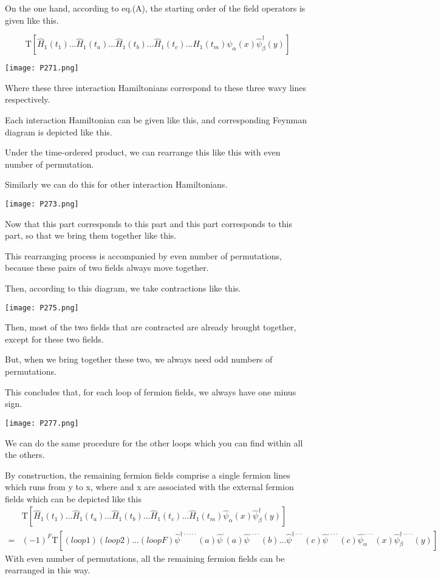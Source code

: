 On the one hand, according to eq.(A), the starting order of the field operators is given like this.

$$\mathrm{T}[\hat H_1(t_1)...\hat H_1(t_a)...\hat H_1(t_b)...\hat H_1(t_c)...\hat H_1(t_m)\hat \psi_{\alpha}(x)\hat \psi_{\beta}^{\dagger}(y)]$$
\begin{center}
\texttt{[image: P271.png]}
\end{center}
Where these three interaction Hamiltonians correspond to these three wavy lines respectively.

Each interaction Hamiltonian can be given like this, and corresponding Feynman diagram is depicted like this.

Under the time-ordered product, we can rearrange this like this with even number of permutation.

Similarly we can do this for other interaction Hamiltonians.
\begin{center}
\texttt{[image: P273.png]}
\end{center}

Now that this part corresponds to this part and this part corresponds to this part, so that we bring them together like this.

This rearranging process is accompanied by even number of permutations, because these pairs of two fields always move together.

Then, according to this diagram, we take contractions like this.
\begin{center}
\texttt{[image: P275.png]}
\end{center}

Then, most of the two fields that are contracted are already brought together, except for these two fields.

But, when we bring together these two, we always need odd numbers of permutations.

This concludes that, for each loop of fermion fields, we always have one minus sign.
\begin{center}
\texttt{[image: P277.png]}
\end{center}

We can do the same procedure for the other loops which you can find within all the others.

By construction, the remaining fermion fields comprise a single fermion lines which runs from y to x, where and x are associated with the external fermion fields which can be depicted like this
\begin{align}
&\mathrm{T}[\hat H_1(t_1)...\hat H_1(t_a)...\hat H_1(t_b)...\hat H_1(t_c)...\hat H_1(t_m)\hat \psi_{\alpha}(x)\hat \psi_{\beta}^{\dagger}(y)]\nonumber \\
=&(-1)^F\mathrm{T}[(loop1)(loop2)...(loopF)\hat \psi^{\dagger\cdot\cdot\cdot\cdot\cdot}(a)\hat \psi^{\cdot}(a)\hat \psi^{\cdot\cdot\cdot\cdot}(b)...\hat \psi^{\dagger\cdot\cdot\cdot}(c)\hat \psi^{\cdot\cdot\cdot\cdot}(c)\hat \psi_{\alpha}^{\cdot\cdot\cdot\cdot}(x)\hat \psi_{\beta}^{\dagger\cdot\cdot\cdot\cdot}(y)]\nonumber
\end{align}
With even number of permutations, all the remaining fermion fields can be rearranged in this way.

